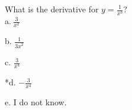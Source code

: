 
What is the derivative for \(y = \frac{1}{x^{3}}\)?\\

a.\(\ \frac{3}{x^{2}}\)

b. \(\frac{1}{{3x}^{2}}\)

c. \(\frac{3}{x^{4}}\)

*d. \(- \frac{3}{x^{4}}\)

e. I do not know.\\

